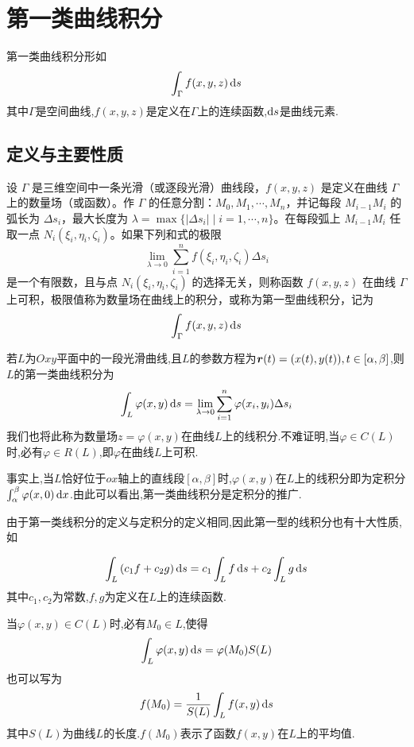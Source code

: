 \setcounter{chapter}{24} %


\chapter{第一类曲线积分}

第一类曲线积分形如$$\int_\Gamma f(x,y,z) \operatorname{d\!} s$$其中$\Gamma$是空间曲线,$f(x,y,z)$是定义在$\Gamma$上的连续函数,$\operatorname{d\!} s$是曲线元素.

\section{定义与主要性质}

\begin{definition}
    设 \( \Gamma \) 是三维空间中一条光滑（或逐段光滑）曲线段，\( f(x, y, z) \) 是定义在曲线 \( \Gamma \) 上的数量场（或函数）。作 \( \Gamma \) 的任意分割：\( M_0, M_1, \cdots, M_n \)，并记每段 \( M_{i-1}M_i \) 的弧长为 \( \Delta s_i \)，最大长度为 \( \lambda = \max\{|\Delta s_i| \mid i = 1, \cdots, n\} \)。在每段弧上 \( M_{i-1}M_i \) 任取一点 \( N_i(\xi_i, \eta_i, \zeta_i) \)。如果下列和式的极限
\[
\lim_{\lambda \to 0} \sum_{i=1}^{n} f(\xi_i, \eta_i, \zeta_i) \Delta s_i
\]
是一个有限数，且与点 \( N_i(\xi_i, \eta_i, \zeta_i) \) 的选择无关，则称函数 \( f(x, y, z) \) 在曲线 \( \Gamma \) 上可积，极限值称为数量场在曲线上的积分，或称为第一型曲线积分，记为
\[
\int_{\Gamma} f(x, y, z) \operatorname{d\!} s
\]
\end{definition}

若$L$为$Oxy$平面中的一段光滑曲线,且$L$的参数方程为$\bm{r}(t) = (x(t),y(t)), t \in [\alpha,\beta]$,则$L$的第一类曲线积分为
$$\int_L \varphi(x,y) \operatorname{d\!} s = \lim_{\lambda \to 0} \sum_{i=1}^{n} \varphi(x_i,y_i) \Delta s_i$$
我们也将此称为数量场$z=\varphi(x,y)$在曲线$L$上的线积分.不难证明,当$\varphi \in C(L)$时,必有$\varphi \in R(L)$,即$\varphi$在曲线$L$上可积.

事实上,当$L$恰好位于$ox$轴上的直线段$[\alpha,\beta]$时,$\varphi(x,y)$在$L$上的线积分即为定积分$\int_{\alpha}^{\beta} \varphi(x,0) \operatorname{d\!} x$.由此可以看出,第一类曲线积分是定积分的推广.

由于第一类线积分的定义与定积分的定义相同,因此第一型的线积分也有十大性质,如
\begin{proposition}[线性性质]
    $$\int_L \left( c_1 f + c_2 g \right) \operatorname{d\!} s = c_1 \int_L f \operatorname{d\!} s + c_2 \int_L g \operatorname{d\!} s$$
其中$c_1,c_2$为常数,$f,g$为定义在$L$上的连续函数.
\end{proposition}

\begin{proposition}
    [积分中值定理]

    当$\varphi(x,y) \in C(L)$时,必有$M_0 \in L$,使得
    $$\int_L \varphi(x,y) \operatorname{d\!} s = \varphi(M_0) S(L)$$
    也可以写为
    $$f(M_0) = \frac{1}{S(L)} \int_L f(x,y) \operatorname{d\!} s$$
    其中$S(L)$为曲线$L$的长度.$f(M_0)$表示了函数$f(x,y)$在$L$上的平均值.
\end{proposition}

